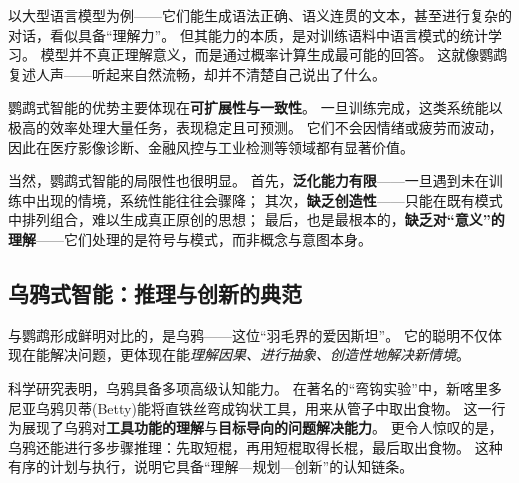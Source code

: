 
以大型语言模型为例——它们能生成语法正确、语义连贯的文本，甚至进行复杂的对话，看似具备“理解力”。  
但其能力的本质，是对训练语料中语言模式的统计学习。  
模型并不真正理解意义，而是通过概率计算生成最可能的回答。  
这就像鹦鹉复述人声——听起来自然流畅，却并不清楚自己说出了什么。  


鹦鹉式智能的优势主要体现在\textbf{可扩展性与一致性}。  
一旦训练完成，这类系统能以极高的效率处理大量任务，表现稳定且可预测。  
它们不会因情绪或疲劳而波动，因此在医疗影像诊断、金融风控与工业检测等领域都有显著价值。  

当然，鹦鹉式智能的局限性也很明显。  
首先，\textbf{泛化能力有限}——一旦遇到未在训练中出现的情境，系统性能往往会骤降；  
其次，\textbf{缺乏创造性}——只能在既有模式中排列组合，难以生成真正原创的思想；  
最后，也是最根本的，\textbf{缺乏对“意义”的理解}——它们处理的是符号与模式，而非概念与意图本身。  


\subsection{乌鸦式智能：推理与创新的典范}  

与鹦鹉形成鲜明对比的，是乌鸦——这位“羽毛界的爱因斯坦”。  
它的聪明不仅体现在能解决问题，更体现在能\emph{理解因果、进行抽象、创造性地解决新情境}。  

科学研究表明，乌鸦具备多项高级认知能力。  
在著名的“弯钩实验”中，新喀里多尼亚乌鸦贝蒂(Betty)能将直铁丝弯成钩状工具，用来从管子中取出食物。  
这一行为展现了乌鸦对\textbf{工具功能的理解}与\textbf{目标导向的问题解决能力}。  
更令人惊叹的是，乌鸦还能进行多步骤推理：先取短棍，再用短棍取得长棍，最后取出食物。  
这种有序的计划与执行，说明它具备“理解—规划—创新”的认知链条。

